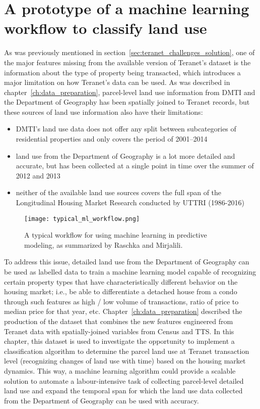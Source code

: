 \chapter{A prototype of a machine learning workflow to classify land use} \label{ch:ml_workflow}

As was previously mentioned in section~\ref{sec:teranet_challenges_solution}, one of the major features missing from the available version of Teranet's dataset is the information about the type of property being transacted, which introduces a major limitation on how Teranet's data can be used.
As was described in chapter~\ref{ch:data_preparation}, parcel-level land use information from DMTI and the Department of Geography has been spatially joined to Teranet records, but these sources of land use information also have their limitations:

\begin{itemize}
    \item DMTI's land use data does not offer any split between subcategories of residential properties and only covers the period of 2001--2014
    \item land use from the Department of Geography is a lot more detailed and accurate, but has been collected at a single point in time over the summer of 2012 and 2013
    \item neither of the available land use sources covers the full span of the Longitudinal Housing Market Research conducted by UTTRI (1986-2016)
\end{itemize}

\begin{figure}[hbt!]
    \centering
    \texttt{[image: typical\_ml\_workflow.png]}
    \caption{A typical workflow for using machine learning in predictive modeling, as summarized by Raschka and Mirjalili\cite{RaschkaMirjalili2017}.}
    \label{fig:typical_ml_workflow}
\end{figure}

To address this issue, detailed land use from the Department of Geography can be used as labelled data to train a machine learning model capable of recognizing certain property types that have characteristically different behavior on the housing market;
i.e., be able to differentiate a detached house from a condo through such features as high / low volume of transactions, ratio of price to median price for that year, etc.
Chapter~\ref{ch:data_preparation} described the production of the dataset that combines the new features engineered from Teranet data with spatially-joined variables from Census and TTS\@.
In this chapter, this dataset is used to investigate the opportunity to implement a classification algorithm to determine the parcel land use at Teranet transaction level (recognizing changes of land use with time) based on the housing market dynamics.
This way, a machine learning algorithm could provide a scalable solution to automate a labour-intensive task of collecting parcel-level detailed land use and expand the temporal span for which the land use data collected from the Department of Geography can be used with accuracy.

